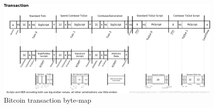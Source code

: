 \begin{figure}[h]
\centering
\includegraphics[width=1\textwidth]{images/TxBinaryMap.png}
\caption{Bitcoin transaction byte-map}
\end{figure}
